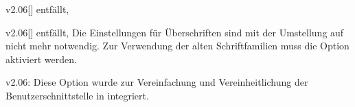 \begin{Obsolete}{v2.06}[]{}{%
  entfällt, %
}
\begin{Obsolete}{v2.06}[]{}{%
  entfällt, %
}
\printobsoletelist%
%
Die Einstellungen für Überschriften sind mit der Umstellung auf \OpenSans nicht 
mehr notwendig. Zur Verwendung der alten Schriftfamilien muss die Option 
 aktiviert werden.
\end{Obsolete}
\end{Obsolete}

\begin{Obsolete}{v2.06:}{%
}
\printobsoletelist%
%
Diese Option wurde zur Vereinfachung und Vereinheitlichung der 
Benutzerschnittstelle in  integriert.
\end{Obsolete}


